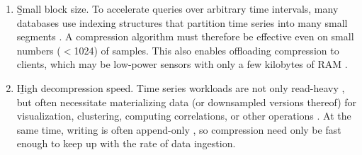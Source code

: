 \begin{enumerate}
\itemsep0mm
\item \b{Small block size}. To accelerate queries over arbitrary time intervals, many databases use indexing structures that partition time series into many small segments \cite{berkeleyTreeDB, respawnDB}. A compression algorithm must therefore be effective even on small numbers ($<$1024) of samples. This also enables offloading compression to clients, which may be low-power sensors with only a few kilobytes of RAM \cite{respawnDB}.
\item \b{High decompression speed}. Time series workloads are not only read-heavy \cite{respawnDB, berkeleyTreeDB, influxDB}, but often necessitate materializing data (or downsampled versions thereof) for visualization, clustering, computing correlations, or other operations \cite{respawnDB}. At the same time, writing is often append-only \cite{gorilla, respawnDB}, so compression need only be fast enough to keep up with the rate of data ingestion.

\end{enumerate}
